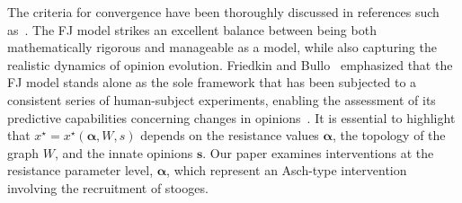 %
%
The criteria for convergence have been thoroughly discussed in references such as~\cite{ghaderi2014opinion,proskurnikov2017tutorial}. The FJ model     strikes an excellent balance between being both mathematically rigorous and manageable as a model, while also capturing the realistic dynamics of opinion evolution. Friedkin and Bullo~\cite{friedkin2017truth}  emphasized that the FJ model stands alone as the sole framework that has been subjected to a consistent series of human-subject experiments, enabling the assessment of its predictive capabilities concerning changes in opinions~\cite{friedkin2011social,friedkin2016theory}. It is essential to highlight that $x^\star=x^\star(\mathbf{\alpha},W,s)$ depends on the resistance values $\mathbf{\alpha}$, the topology of the graph $W$, and the innate opinions $\mathbf{s}$.   Our paper examines interventions at the resistance parameter level, \(\mathbf{\alpha}\), which represent an Asch-type intervention involving the recruitment of stooges.


